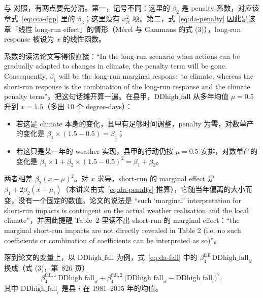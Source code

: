 与  对照，有两点要先分清。第一，记号不同：这里的 $\beta_2$ 是 penalty 系数，对应该章式~\ref{eq:cca-dgp} 里的 $\beta_3$；这里没有 $x_{it}^2$ 项。第二，式~\ref{eq:da-penalty} 因此是该章「线性 long-run effect」的情形（Mérel 与 Gammans 的式 (3)），long-run response 被设为 $x$ 的线性函数。

系数的读法论文写得很直接：``In the long-run scenario when actions can be gradually adapted to changes in climate, the penalty term will be gone. Consequently, $\beta_1$ will be the long-run marginal response to climate, whereas the short-run response is the combination of the long-run response and the climate penalty term''\citep[第~826 页]{da2024climate}。把这句话摊开算一遍。在县甲，$\mathrm{DDhigh\_fall}$ 从多年均值 $\mu=0.5$ 升到 $x=1.5$（多出 10 个 degree-days）：

\begin{itemize}
  \item 若这是 climate 本身的变化，县甲有足够时间调整，penalty 为零，对数单产的变化是 $\beta_1\times(1.5-0.5)=\beta_1$；
  \item 若这只是某一年的 weather 实现，县甲的行动仍按 $\mu=0.5$ 安排，对数单产的变化是 $\beta_1\times1+\beta_2\times(1.5-0.5)^2=\beta_1+\beta_2$。
\end{itemize}

两者相差 $\beta_2(x-\mu)^2$。对 $x$ 求导，short-run 的 marginal effect 是 $\beta_1+2\beta_2(x-\mu_i)$（本讲义由式~\ref{eq:da-penalty} 推算），它随当年偏离的大小而变，没有一个固定的数值。论文的说法是 ``such `marginal' interpretation for short-run impacts is contingent on the actual weather realisation and the local climate''\citep[第~826 页]{da2024climate}，并因此提醒 Table~2 里读不出 short-run 的 marginal effect：``the marginal short-run impacts are not directly revealed in Table 2 (i.e. no such coefficients or combination of coefficients can be interpreted as so)''\citep[第~832 页]{da2024climate}。

落到论文的变量上，以 $\mathrm{DDhigh\_fall}$ 为例，式~\ref{eq:da-fall} 中的 $\beta^{\mathrm{fall}}_4\,\mathrm{DDhigh\_fall}_{it}$ 换成（式 (3)，第~826 页）
\begin{equation}
\beta^{\mathrm{fall},1}_4\,\mathrm{DDhigh\_fall}_{it} + \beta^{\mathrm{fall},2}_4\,\bigl(\mathrm{DDhigh\_fall}_{it}-\overline{\mathrm{DDhigh\_fall}}_i\bigr)^2 ,
\label{eq:da-ddhigh}
\end{equation}
其中 $\overline{\mathrm{DDhigh\_fall}}_i$ 是县 $i$ 在 1981--2015 年的均值。

